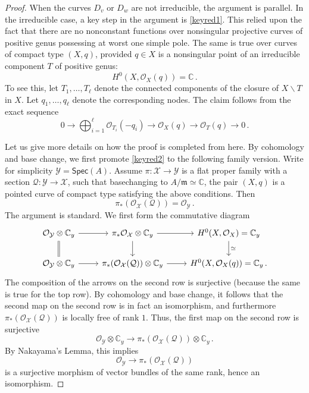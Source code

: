 \documentclass[11pt]{amsart}
\theoremstyle{definition}
\newcommand{\Xb}{\mathcal{X}}
\newcommand {\Yb}{\mathcal {Y}}
\begin{document}
{\begin{proof}
When the curves $D_v$ or $D_w$ are not irreducible, the argument is parallel. In the irreducible case, a key step in the argument is \eqref{keyred1}. This relied upon the fact that there are no nonconstant functions over nonsingular projective curves of positive genus possessing at worst one simple pole. The same is true over curves of compact type $(X, q)$, provided $q\in X$ is a nonsingular  point of an irreducible component $T$ of positive genus: \begin{equation}\label{keyred2}H^0(X, \mathcal O_X(q))=\mathbb C\,.\end{equation} To see this, let $T_1, \ldots, T_\ell$ denote the connected components of the closure of $X\smallsetminus T$ in $X$. Let $q_1, \ldots, q_\ell$ denote the corresponding nodes. The claim follows from the exact sequence $$0\to \bigoplus_{i=1}^{\ell} \mathcal O_{T_i}(-q_i) \to \mathcal O_{X}(q)\to \mathcal O_T(q)\to 0\, .$$ 

Let us give more details on how the proof is completed from here. By cohomology and base change, we first promote \eqref{keyred2} to the following family version. Write for simplicity $\mathcal Y=\textsf{Spec}(A)$. Assume $\pi: \Xb\to \Yb$ is a flat proper family with a section $\mathcal Q:\Yb \to \Xb$, such that basechanging to $A/\mathfrak m\simeq \mathbb C$, the pair $(X, q)$ is a pointed curve of compact type satisfying the above conditions. Then \begin{equation}\label{keyred3}\pi_{*}(\mathcal O_{\mathcal X}(\mathcal Q))={\mathcal O}_{\Yb}\, .\end{equation} The argument is standard. We first form the commutative diagram \[\begin{tikzcd}\mathcal O_{\Yb}\otimes \mathbb C_y \ar[r] \ar[d, equal]&\pi_{*}\mathcal O_{\Xb}\otimes \mathbb C_y\ar[r]\ar[d] &H^0(X, \mathcal O_X)=\mathbb C_y\ar[d, "\simeq"] \\ 
\mathcal O_{\Yb}\otimes \mathbb C_y\ar[r] & \pi_{*}(\mathcal O_{\Xb}(\mathcal Q))\otimes \mathbb C_y\ar[r] & H^0(X, \mathcal O_X(q))=\mathbb C_y\, .\end{tikzcd}\]
The composition of the arrows on the second row is surjective (because the same is true for the top row). By cohomology and base change, it follows that the second map on the second row is in fact an isomorphism, and furthermore $\pi_{*}(\mathcal O_{\Xb}(\mathcal Q))$ is locally free of rank $1$. Thus, the first map on the second row is surjective $$\mathcal O_{\Yb}\otimes \mathbb C_y \to \pi_{*}(\mathcal O_{\Xb} (\mathcal Q))\otimes \mathbb C_y\, .$$ By Nakayama's Lemma, this implies $$\mathcal O_{\Yb}\to \pi_{*} (\mathcal O_{\Xb}(\mathcal Q))$$ is a surjective morphism of vector bundles of the same rank, hence an isomorphism. 


\end{proof}}
\end{document}
